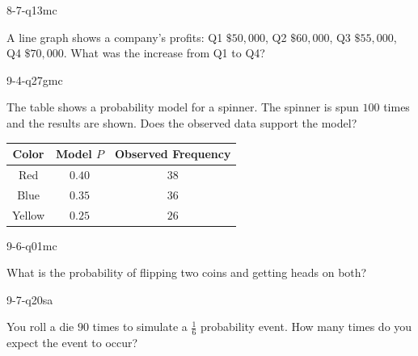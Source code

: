 \begin{practiceQuestion}{8-7-q13}{mc}
\begin{questionText}
A line graph shows a company's profits: Q1 $\$50{,}000$, Q2 $\$60{,}000$, Q3 $\$55{,}000$, Q4 $\$70{,}000$. What was the increase from Q1 to Q4?
\end{questionText}
\end{practiceQuestion}

\begin{practiceQuestion}{9-4-q27}{gmc}
\begin{questionText}
The table shows a probability model for a spinner. The spinner is spun $100$ times and the results are shown. Does the observed data support the model?

\begin{center}
\begin{tabular}{|c|c|c|}
\hline
\textbf{Color} & \textbf{Model $P$} & \textbf{Observed Frequency} \\
\hline
Red & $0.40$ & $38$ \\
\hline
Blue & $0.35$ & $36$ \\
\hline
Yellow & $0.25$ & $26$ \\
\hline
\end{tabular}
\end{center}
\end{questionText}
\end{practiceQuestion}

\begin{practiceQuestion}{9-6-q01}{mc}
\begin{questionText}
What is the probability of flipping two coins and getting heads on both?
\end{questionText}
\end{practiceQuestion}

\begin{practiceQuestion}{9-7-q20}{sa}
\begin{questionText}
You roll a die $90$ times to simulate a $\frac{1}{6}$ probability event. How many times do you expect the event to occur?
\end{questionText}
\end{practiceQuestion}
